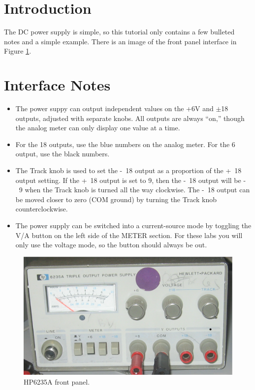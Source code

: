 \documentclass{article}
\begin{document}
\thispagestyle{plain}


\section{Introduction}
The DC power supply is simple, so this tutorial only contains a few bulleted notes and a simple example. There is an image of the front panel interface in Figure \ref{frontpanel}.

\section{Interface Notes}
\begin{itemize}
\item The power suppy can output independent values on the +6V and $\pm$\unit{18}{\volt} outputs, adjusted with separate knobs. All outputs are always ``on,'' though the analog meter can only display one value at a time.
\item For the \unit{18}{\volt} outputs, use the blue numbers on the analog meter. For the \unit{6}{\volt} output, use the black numbers.
\item The Track knob is used to set the \unit{-18}{\volt} output as a proportion of the \unit{+18}{\volt} output setting. If the \unit{+18}{\volt} output is set to \unit{9}{\volt}, then the \unit{-18}{\volt} output will be \unit{-9}{\volt} when the Track knob is turned all the way clockwise. The \unit{-18}{\volt} output can be moved closer to zero (COM ground) by turning the Track knob counterclockwise.
\item The power supply can be switched into a current-source mode by toggling the V/A button on the left side of the METER section. For these labs you will only use the voltage mode, so the button should always be out.
\end{itemize}


\begin{figure}[!htb]
  \centering
  \includegraphics[width=5.0in]{HP6235A.eps}
  \caption{HP6235A front panel.}
  \label{frontpanel}
\end{figure}
\end{document}
